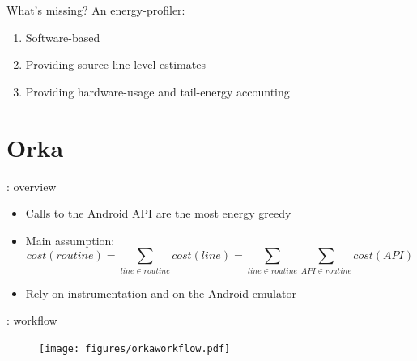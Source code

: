 %
%
\begin{frame}{What's missing?}
An energy-profiler:
\begin{enumerate}
\item \alert{Software-based}
\item Providing \alert{source-line level} estimates
\item Providing hardware-usage and \alert{tail-energy} accounting
\end{enumerate}
\end{frame}
%
%
\section{Orka}
\begin{frame}{\orka{}: overview}
\begin{itemize}
\item Calls to the Android API are the most energy greedy
\item Main assumption: 
$$ cost(routine) = \sum_{line \in routine} cost(line) = \sum_{line \in routine} \sum_{API \in routine} cost(API)$$
\item Rely on \alert{instrumentation} and on the Android \alert{emulator}
\end{itemize}
\end{frame}
%
%
\begin{frame}{\orka{}: workflow}
\begin{figure}
        \texttt{[image: figures/orkaworkflow.pdf]}
\end{figure}
\end{frame}
%
%
